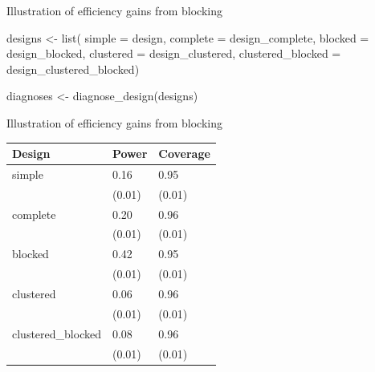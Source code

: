 \documentclass[
  11pt,
  ignorenonframetext,
]{beamer}
\newenvironment{Shaded}{\begin{snugshade}}{\end{snugshade}}
\newcommand{\AttributeTok}[1]{\textcolor[rgb]{0.40,0.45,0.13}{#1}}
\newcommand{\FunctionTok}[1]{\textcolor[rgb]{0.28,0.35,0.67}{#1}}
\newcommand{\NormalTok}[1]{\textcolor[rgb]{0.00,0.23,0.31}{#1}}
\newcommand{\OtherTok}[1]{\textcolor[rgb]{0.00,0.23,0.31}{#1}}
\begin{document}
\begin{frame}[fragile]{Illustration of efficiency gains from blocking}
\protect\hypertarget{illustration-of-efficiency-gains-from-blocking}{}
\begin{Shaded}
\begin{Highlighting}[]
\NormalTok{designs }\OtherTok{\textless{}{-}} 
  \FunctionTok{list}\NormalTok{(}
    \AttributeTok{simple =}\NormalTok{ design, }
    \AttributeTok{complete =}\NormalTok{ design\_complete, }
    \AttributeTok{blocked =}\NormalTok{ design\_blocked, }
    \AttributeTok{clustered =}\NormalTok{ design\_clustered,  }
    \AttributeTok{clustered\_blocked =}\NormalTok{ design\_clustered\_blocked) }
\end{Highlighting}
\end{Shaded}

\begin{Shaded}
\begin{Highlighting}[]
\NormalTok{diagnoses }\OtherTok{\textless{}{-}} \FunctionTok{diagnose\_design}\NormalTok{(designs)}
\end{Highlighting}
\end{Shaded}
\end{frame}

\begin{frame}{Illustration of efficiency gains from blocking}
\protect\hypertarget{illustration-of-efficiency-gains-from-blocking-1}{}
\begin{tabular}{l|l|l}
\hline
Design & Power & Coverage\\
\hline
simple & 0.16 & 0.95\\
\hline
 & (0.01) & (0.01)\\
\hline
complete & 0.20 & 0.96\\
\hline
 & (0.01) & (0.01)\\
\hline
blocked & 0.42 & 0.95\\
\hline
 & (0.01) & (0.01)\\
\hline
clustered & 0.06 & 0.96\\
\hline
 & (0.01) & (0.01)\\
\hline
clustered\_blocked & 0.08 & 0.96\\
\hline
 & (0.01) & (0.01)\\
\hline
\end{tabular}
\end{frame}
\end{document}

